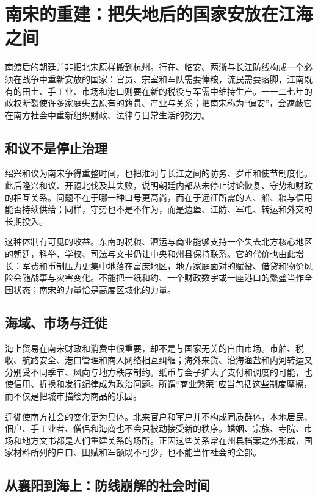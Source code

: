 \section{南宋的重建：把失地后的国家安放在江海之间}

南渡后的朝廷并非把北宋原样搬到杭州。行在、临安、两浙与长江防线构成一个必须在战争中重新安放的国家：官员、宗室和军队需要俸粮，流民需要落脚，江南既有的田土、手工业、市场和港口则要在新的税役与军需中维持生产。一一二七年的政权断裂使许多家庭失去原有的籍贯、产业与关系；把南宋称为“偏安”，会遮蔽它在南方社会中重新组织财政、法律与日常生活的努力。

\subsection{和议不是停止治理}

绍兴和议为南宋争得重整时间，也把淮河与长江之间的防务、岁币和使节制度化。此后隆兴和议、开禧北伐及其失败，说明朝廷内部从未停止讨论恢复、守势和财政的相互关系。问题不在于哪一种口号更高尚，而在于远征所需的人、船、粮与信用能否持续供给；同样，守势也不是不作为，而是边堡、江防、军屯、转运和外交的长期投入。

这种体制有可见的收益。东南的税粮、漕运与商业能够支持一个失去北方核心地区的朝廷，科举、学校、司法与文书仍让中央和州县保持联系。它的代价也由此增长：军费和币制压力更集中地落在富庶地区，地方家庭面对的赋役、借贷和物价风险会随战事与灾害变化。不能把一纸和约、一个财政数字或一座港口的繁盛当作全国状态；南宋的力量恰是高度区域化的力量。

\subsection{海域、市场与迁徙}

海上贸易在南宋财政和消费中很重要，却不是与国家无关的自由市场。市舶、税收、航路安全、港口管理和商人网络相互纠缠；海外来货、沿海渔盐和内河转运又分别受不同季节、风向与地方秩序制约。纸币与会子扩大了支付和调度的可能，也使信用、折换和发行纪律成为政治问题。所谓“商业繁荣”应当包括这些制度摩擦，而不仅是把城市描绘为商品的乐园。

迁徙使南方社会的变化更为具体。北来官户和军户并不构成同质群体，本地居民、佃户、手工业者、僧侣和海商也不会只被动接受新的秩序。婚姻、宗族、寺院、市场和地方文书都是人们重建关系的场所。正因这些关系常在州县档案之外形成，国家材料所列的户口、田赋和军额既不可少，也不能当作社会的全部。

\subsection{从襄阳到海上：防线崩解的社会时间}

